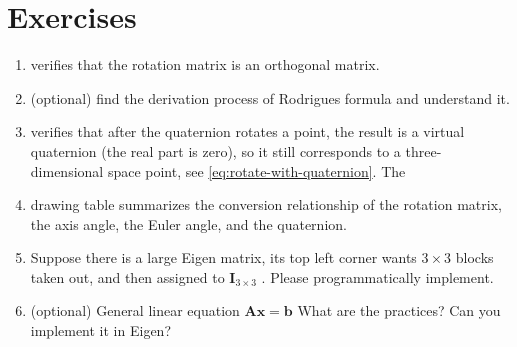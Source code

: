 \section*{ Exercises}

\begin{enumerate}
	\item verifies that the rotation matrix is an orthogonal matrix.
	\item (optional) find the derivation process of Rodrigues formula and understand it.
	\item verifies that after the quaternion rotates a point, the result is a virtual quaternion (the real part is zero), so it still corresponds to a three-dimensional space point, see \eqref{eq:rotate-with-quaternion}.
	The \item drawing table summarizes the conversion relationship of the rotation matrix, the axis angle, the Euler angle, and the quaternion.
	\item Suppose there is a large Eigen matrix, its top left corner wants $3 \times 3$ blocks taken out, and then assigned to $\bm{I}_{3 \times 3}$ . Please programmatically implement.
	\item (optional) General linear equation $\bm{A} \bm{x}=\bm{b}$ What are the practices? Can you implement it in Eigen?
\end{enumerate}
